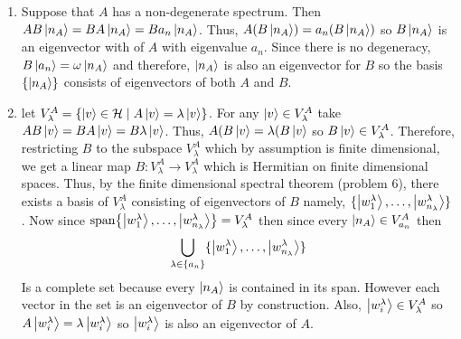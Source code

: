 \documentclass[12pt]{extarticle}
\begin{document}
\begin{enumerate}

\item Suppose that $A$ has a non-degenerate spectrum. Then $AB \left| n_A \right> = BA \left| n_A \right> = B a_n \left| n_A \right>$. Thus, $A(B \left| n_A \right>) = a_n (B \left| n_A \right>)$ so $B \left| n_A \right>$ is an eigenvector with of $A$ with eigenvalue $a_n$. Since there is no degeneracy, $B \left| a_n \right> = \omega \left| n_A \right>$ and therefore, $\left| n_A \right>$ is also an eigenvector for $B$ so the basis $\{ \left| n_A \right> \}$ consists of eigenvectors of both $A$ and $B$. 

\item let $V_\lambda^A = \{\left| v \right> \in \mathcal{H} \mid A \left| v \right> = \lambda \left| v \right> \}$. For any $\left| v \right> \in V_\lambda^A$ take $AB \left| v \right> = BA \left| v \right> = B \lambda \left| v \right>$. Thus, $A(B \left| v \right> = \lambda (B \left| v \right>$ so $B \left| v \right> \in V_\lambda^A$. Therefore, restricting $B$ to the subspace $V_\lambda^A$ which by assumption is finite dimensional, we get a linear map $B : V_\lambda^A \rightarrow V_\lambda^A$ which is Hermitian on finite dimensional spaces. Thus, by the finite dimensional spectral theorem (problem 6), there exists a basis of $V_\lambda^A$ consisting of eigenvectors of $B$ namely, $\{\left| w^\lambda_1 \right>, \dots , \left| w^\lambda_{n_\lambda} \right>\}$. Now since $\mathrm{span}\! \left\{\left| w^\lambda_1 \right>, \dots , \left| w^\lambda_{n_\lambda} \right> \right\} = V_\lambda^A$ then since every $\left| n_A \right> \in V_{a_n}^A$ then \[\bigcup\limits_{\lambda \in \{a_n\}} \{\left| w^\lambda_1 \right>, \dots , \left| w^\lambda_{n_\lambda} \right>\}\]
Is a complete set because every $\left| n_A \right>$ is contained in its span. However each vector in the set is an eigenvector of $B$ by construction. Also, $\left| w^\lambda_i \right> \in V_\lambda^A$ so $A \left| w^\lambda_i \right> = \lambda \left| w^\lambda_i \right>$ so $\left| w^\lambda_i \right>$ is also an eigenvector of $A$. 


\end{enumerate}
\end{document}
